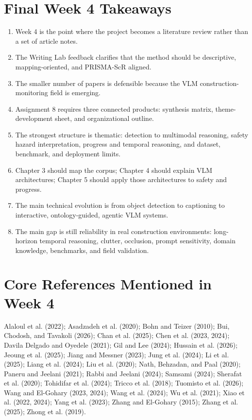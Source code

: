 \documentclass[10pt,letterpaper]{article}
\begin{document}
\section{Final Week 4 Takeaways}

\begin{enumerate}
\item Week 4 is the point where the project becomes a literature review rather than a set of article notes.
\item The Writing Lab feedback clarifies that the method should be descriptive, mapping-oriented, and PRISMA-ScR aligned.
\item The smaller number of papers is defensible because the VLM construction-monitoring field is emerging.
\item Assignment 8 requires three connected products: synthesis matrix, theme-development sheet, and organizational outline.
\item The strongest structure is thematic: detection to multimodal reasoning, safety hazard interpretation, progress and temporal reasoning, and dataset, benchmark, and deployment limits.
\item Chapter 3 should map the corpus; Chapter 4 should explain VLM architectures; Chapter 5 should apply those architectures to safety and progress.
\item The main technical evolution is from object detection to captioning to interactive, ontology-guided, agentic VLM systems.
\item The main gap is still reliability in real construction environments: long-horizon temporal reasoning, clutter, occlusion, prompt sensitivity, domain knowledge, benchmarks, and field validation.
\end{enumerate}

\section*{Core References Mentioned in Week 4}

\small
Alaloul et al. (2022); Asadzadeh et al. (2020); Bohn and Teizer (2010); Bui, Chodosh, and Tavakoli (2026); Chan et al. (2025); Chen et al. (2023, 2024); Davila Delgado and Oyedele (2021); Gil and Lee (2024); Hussain et al. (2026); Jeoung et al. (2025); Jiang and Messner (2023); Jung et al. (2024); Li et al. (2025); Liang et al. (2024); Liu et al. (2020); Nath, Behzadan, and Paal (2020); Paneru and Jeelani (2021); Rabbi and Jeelani (2024); Samsami (2024); Sherafat et al. (2020); Tohidifar et al. (2024); Tricco et al. (2018); Tuomisto et al. (2026); Wang and El-Gohary (2023, 2024); Wang et al. (2024); Wu et al. (2021); Xiao et al. (2022, 2024); Yang et al. (2023); Zhang and El-Gohary (2015); Zhang et al. (2025); Zhong et al. (2019).
\end{document}
